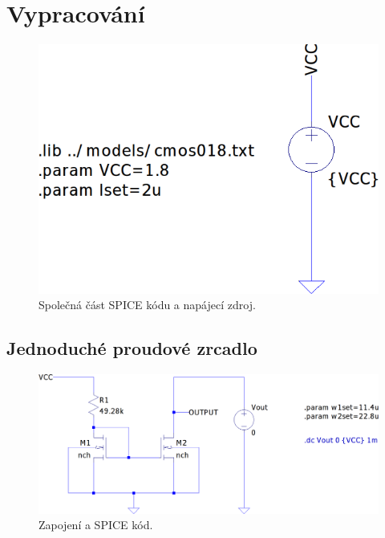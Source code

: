 \documentclass{protokol}
\begin{document}
	\maketitle

\section{Vypracování}

\begin{figure}[h!]
  \centering
  \includegraphics[scale=0.4]{spice0.png}
  \caption{Společná část SPICE kódu a napájecí zdroj.}
  \label{fig:spice0-png}
\end{figure}

\subsection{Jednoduché proudové zrcadlo}
\begin{figure}[h!]
  \centering
  \includegraphics[scale=0.4]{spice1.png}
  \caption{Zapojení a SPICE kód.}
  \label{fig:spice1-png}
\end{figure}

\end{document}

